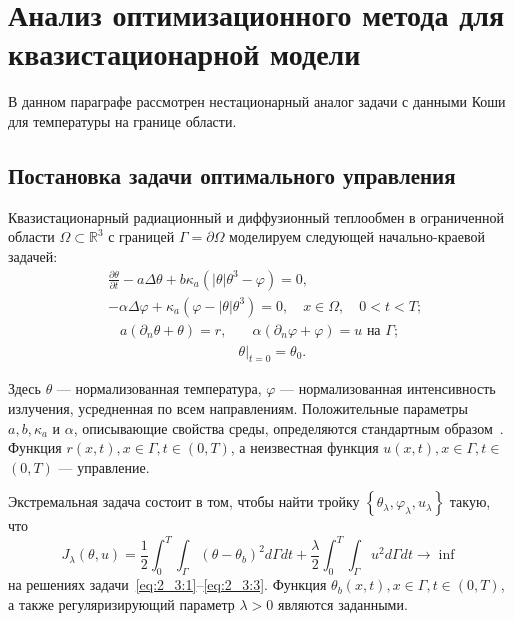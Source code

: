 \section{Анализ оптимизационного метода для квазистационарной модели}
\label{sec:ch2/sec3}
В данном параграфе рассмотрен нестационарный аналог задачи
с данными Коши для температуры на границе области.

\subsection{Постановка задачи оптимального управления}
\label{subsec:ch2/sec3/state}
Квазистационарный радиационный и диффузионный теплообмен в ограниченной области
$\Omega \subset \mathbb{R}^{3}$ с границей $\Gamma=\partial \Omega$ моделируем
следующей начально-краевой задачей:
\begin{equation}
    \label{eq:2_3:1}
    \begin{split}
        & \frac{\partial \theta}{\partial t} - a \Delta \theta
        + b \kappa_{a} \left(|\theta| \theta^{3}-\varphi\right) = 0,\\
        & - \alpha \Delta \varphi
        + \kappa_{a} \left(\varphi-|\theta| \theta^{3}\right) = 0,
        \quad x \in \Omega, \quad 0 < t < T;
    \end{split}
\end{equation}
\begin{align}
    a \left(\partial_{n} \theta+\theta\right)=r,
    & \quad \alpha\left(\partial_{n} \varphi
    + \varphi\right) = u \text { на } \Gamma;  \label{eq:2_3:2}\\
    & \left.\theta\right|_{t=0} = \theta_{0}. \label{eq:2_3:3}
\end{align}

Здесь $\theta$ — нормализованная температура,
$\varphi$ — нормализованная интенсивность излучения,
усредненная по всем направлениям.
Положительные параметры $a, b, \kappa_{a}$ и $\alpha$,
описывающие свойства среды,
определяются стандартным образом~\cite{Kovtanyuk2015}.
Функция $r(x, t), x \in \Gamma, t \in(0, T)$,
а неизвестная функция $u(x, t), x \in \Gamma, t \in$ $(0, T)$ — управление.


Экстремальная задача состоит в том, чтобы найти тройку
$\left\{\theta_{\lambda}, \varphi_{\lambda}, u_{\lambda}\right\}$ такую, что
\begin{equation}
    \label{eq:2_3:4}
    J_{\lambda}(\theta, u)=\frac{1}{2} \int_{0}^{T}
    \int_{\Gamma}\left(\theta-\theta_{b}\right)^{2} d \Gamma d t+\frac{\lambda}{2}
    \int_{0}^{T} \int_{\Gamma} u^{2} d \Gamma d t \rightarrow \inf
\end{equation}
на решениях задачи~\eqref{eq:2_3:1}--\eqref{eq:2_3:3}.
Функция $\theta_{b}(x, t), x \in \Gamma, t \in(0, T)$,
а также регуляризирующий параметр $\lambda>0$ являются заданными.

